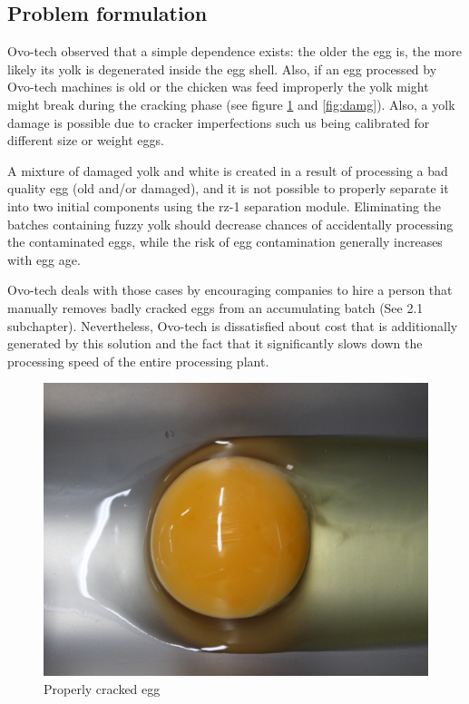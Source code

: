 \documentclass[12pt,twoside,a4paper]{article}
\begin{document}
\subsection{Problem formulation}
Ovo-tech observed that a simple dependence exists: the older the egg is, the more likely its yolk is degenerated inside the egg shell. Also, if an egg processed by Ovo-tech machines is old or the chicken was feed improperly the yolk might might break during the cracking phase (see figure \ref{fig:prop} and \ref{fig:damg}).
Also, a yolk damage is possible due to cracker imperfections such us being calibrated for different size or weight eggs.

A mixture of damaged yolk and white is created in a result of processing a bad quality egg (old and/or damaged), and it is not possible to properly separate it into two initial components using the rz-1 separation module.
Eliminating the batches containing fuzzy yolk should decrease chances of accidentally processing the contaminated eggs, while the risk of egg contamination generally increases with egg age.

Ovo-tech deals with those cases by encouraging companies to hire a person that manually removes badly cracked eggs from an accumulating batch (See 2.1 subchapter). Nevertheless, Ovo-tech is dissatisfied about cost that is additionally generated by this solution and the fact that it significantly slows down the processing speed of the entire processing plant.
\begin{figure}[H]
\centering
\includegraphics[width=0.4\paperwidth]{prop}
\caption{Properly cracked egg}\label{fig:prop}
\end{figure} 
\end{document}
